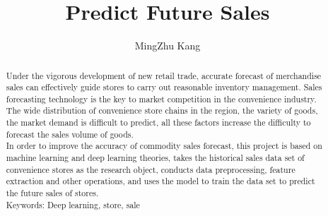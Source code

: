 \documentclass{amsart}
\begin{document}
%
%
\title[A Short Running Title]{Predict Future Sales}%

\author{MingZhu Kang}
\address[A.~1]{School of Computer Science,\\ 
Xi'an Shiyou University, Shaanxi 710065, China}%


%
%
\date{\gitAuthorDate}%

\begin{abstract}
    Under the vigorous development of new retail trade, 
    accurate forecast of merchandise sales can effectively guide stores
    to carry out reasonable inventory management.
    Sales forecasting technology is the key to market competition in the convenience industry.
    The wide distribution of convenience store chains in the region, the variety of goods,  
    the market demand is difficult to predict, 
    all these factors increase the difficulty to forecast the sales volume of goods.
    \\In order to improve the accuracy of commodity sales forecast,
    this project is based on machine learning and deep learning theories, 
    takes the historical sales data set of convenience stores as the research object,
    conducts data preprocessing, feature extraction and other operations, 
    and uses the model to train the data set to predict the future sales of stores.
    \\
    Keywords: Deep learning, store, sale
\end{abstract}

\maketitle
\tableofcontents

\newpage



\newpage




\listoftodos
\end{document}
